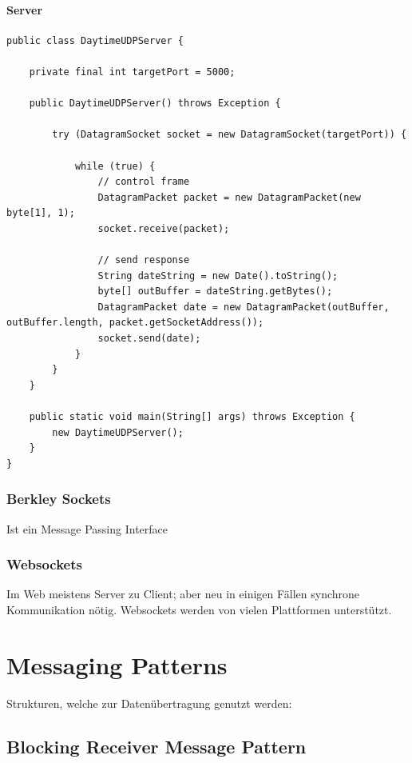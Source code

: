 \paragraph{Server} \hfill

\begin{lstlisting}
public class DaytimeUDPServer {
	
	private final int targetPort = 5000;
	
	public DaytimeUDPServer() throws Exception {
		
		try (DatagramSocket socket = new DatagramSocket(targetPort)) {
			
			while (true) {
				// control frame
				DatagramPacket packet = new DatagramPacket(new byte[1], 1);
				socket.receive(packet);
				
				// send response
				String dateString = new Date().toString();
				byte[] outBuffer = dateString.getBytes();
				DatagramPacket date = new DatagramPacket(outBuffer, outBuffer.length, packet.getSocketAddress());
				socket.send(date);
			}
		}
	}
	
	public static void main(String[] args) throws Exception {
		new DaytimeUDPServer();
	}
}
\end{lstlisting}




\subsubsection{Berkley Sockets}

Ist ein Message Passing Interface

\subsubsection{Websockets}

Im Web meistens Server zu Client; aber neu in einigen Fällen synchrone Kommunikation nötig. Websockets werden von vielen Plattformen unterstützt.

\section{Messaging Patterns}

Strukturen, welche zur Datenübertragung genutzt werden:

\subsection{Blocking Receiver Message Pattern}

